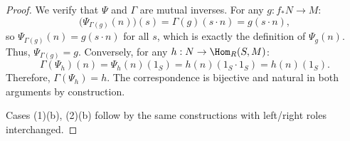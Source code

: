 \begin{proof}
    We verify that $\Psi$ and $\Gamma$ are mutual inverses. For any $g : f_*N \to M$:
    $$\bigl(\Psi_{\Gamma(g)}(n)\bigr)(s) = \Gamma(g)(s \cdot n) = g(s \cdot n),$$
    so $\Psi_{\Gamma(g)}(n) = g(s \cdot n)$ for all $s$, which is exactly the definition of $\Psi_g(n)$. Thus, $\Psi_{\Gamma(g)} = g$. Conversely, for any $h : N \to \Hom_R(S, M)$:
    $$\Gamma(\Psi_h)(n) = \Psi_h(n)(1_S) = h(n)(1_S \cdot 1_S) = h(n)(1_S).$$
    Therefore, $\Gamma(\Psi_h) = h$. The correspondence is bijective and natural in both arguments by construction.

    Cases (1)(b), (2)(b) follow by the same constructions with left/right roles interchanged.
\end{proof}
